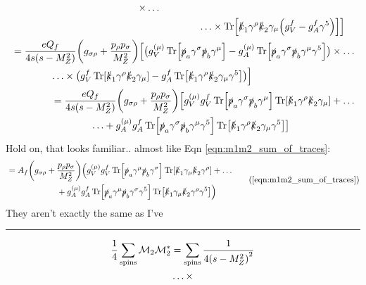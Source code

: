 \documentclass[12 pt,draft]{article}
\renewcommand{\b}[1]{\overline{#1}}
\begin{document}
\begin{problem}[ $\mu\b{\mu}\rightarrow f\b{f}$]
\begin{align}
\begin{split}
				\times\ldots\\&\qquad\qquad\ldots\times
				\Tr[\slashed{k}_1\gamma^\rho\slashed{k}_2\gamma_\mu\qty(g_V^f-g_A^f\gamma^5)]
				\Big]
			\end{split}
			\\
			\begin{split}
				&=\frac{eQ_f}{4s\qty(s-M_Z^2)}
				\qty(g_{\sigma\rho}+\frac{p_\rho p_\sigma}{M_Z^2})
				\Big[
				\big(g_V^{(\mu)}\Tr[\slashed{p}_a\gamma^\sigma\slashed{p}_b\gamma^\mu]
				-g_A^{(\mu)}\Tr[\slashed{p}_a\gamma^\sigma\slashed{p}_b\gamma^\mu\gamma^5]
				\big)
				\times\ldots\\&\qquad\qquad\ldots\times
				\big(g_V^f\Tr[\slashed{k}_1\gamma^\rho\slashed{k}_2\gamma_\mu]-g_A^f\Tr[\slashed{k}_1\gamma^\rho\slashed{k}_2\gamma_\mu\gamma^5]\big)
				\Big]
			\end{split}
			\\
			\begin{split}
				&=\frac{eQ_f}{4s\qty(s-M_Z^2)}
				\qty(g_{\sigma\rho}+\frac{p_\rho p_\sigma}{M_Z^2})
				\Big[
					g_V^{(\mu)}g_V^f
					\Tr[\slashed{p}_a\gamma^\sigma\slashed{p}_b\gamma^\mu]
					\Tr[\slashed{k}_1\gamma^\rho\slashed{k}_2\gamma_\mu]
					+\ldots\\&\qquad\qquad\ldots+
					g_A^{(\mu)}g_A^f\Tr[\slashed{p}_a\gamma^\sigma\slashed{p}_b\gamma^\mu\gamma^5]\Tr[\slashed{k}_1\gamma^\rho\slashed{k}_2\gamma_\mu\gamma^5]
				\big]
			\end{split}
		\end{align}
		Hold on, that looks familiar.. almost like Eqn \ref{eqn:m1m2_sum_of_traces}:
		\begin{align}
			\begin{split}
				&=A_f
				\qty(g_{\sigma\rho}+\frac{p_\rho p_\sigma}{M_Z^2})
				\Big(g_V^{(\mu)}g_V^f\Tr[\slsh{p}_a\gamma^\mu \slsh{p}_b\gamma^\sigma]
				\Tr[\slsh{k}_1\gamma_\mu \slsh{k}_2\gamma^\rho]
				+\ldots\\&\qquad\qquad\qquad+
				g_A^{(\mu)}g_A^f\Tr[\slsh{p}_a\gamma^\mu \slsh{p}_b\gamma^\sigma\gamma^5]\Tr[\slsh{k}_1\gamma_\mu \slsh{k}_2\gamma^\rho\gamma^5]
				\Big)
			\end{split}\tag{\ref{eqn:m1m2_sum_of_traces}}
		\end{align}
		They aren't exactly the same as I've
	\hrule
	\newpage
		\begin{align}
			\begin{split}
				\oo{4}\sum_\text{spins}\mathcal{M}_2\mathcal{M}_2^*
				&=\sum_\text{spins}
				\frac{1}{4\qty(s-M_Z^2)^2}
				\\&\ldots\times

\end{split}
\end{align}
\end{problem}
\end{document}
